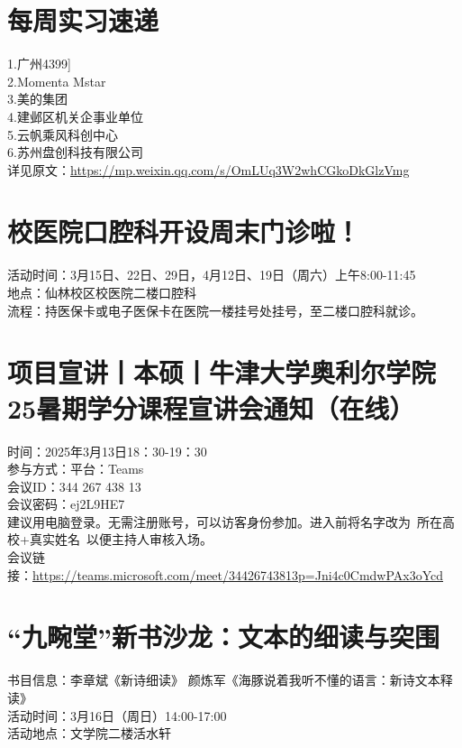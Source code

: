 \documentclass[letterpaper, 12pt]{article}
\begin{document}
\begin{multicols}{2}
\section{每周实习速递}
1.广州4399]\\
2.Momenta Mstar\\
3.美的集团\\
4.建邺区机关企事业单位\\
5.云帆乘风科创中心\\
6.苏州盘创科技有限公司\\
详见原文：\url{https://mp.weixin.qq.com/s/OmLUq3W2whCGkoDkGlzVmg}

\section{校医院口腔科开设周末门诊啦！}
活动时间：3月15日、22日、29日，4月12日、19日（周六）上午8:00-11:45\\
地点：仙林校区校医院二楼口腔科\\
流程：持医保卡或电子医保卡在医院一楼挂号处挂号，至二楼口腔科就诊。\\
\section{项目宣讲丨本硕丨牛津大学奥利尔学院25暑期学分课程宣讲会通知（在线）}
时间：2025年3月13日18：30-19：30\\
参与方式：平台：Teams\\
会议ID：344 267 438 13\\
会议密码：ej2L9HE7\\
建议用电脑登录。无需注册账号，可以访客身份参加。进入前将名字改为 所在高校+真实姓名 以便主持人审核入场。\\
会议链接：‍‍‍‍‍\url{https://teams.microsoft.com/meet/34426743813p=Jni4c0CmdwPAx3oYcd}





\section{“九畹堂”新书沙龙：文本的细读与突围}
书目信息：李章斌《新诗细读》 颜炼军《海豚说着我听不懂的语言：新诗文本释读》\\
活动时间：3月16日（周日）14:00-17:00\\
活动地点：文学院二楼活水轩\\

\end{multicols}
\end{document}
